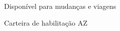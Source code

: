 

\begin{cventries}

  \cventry
    {}{}{}{} 
    {
    \vspace{-1 cm}  %
	\begin{cvitems} 
		\item {Disponível para mudanças e viagens}
		\item {Carteira de habilitação AZ}
	\end{cvitems}
    }

\end{cventries}